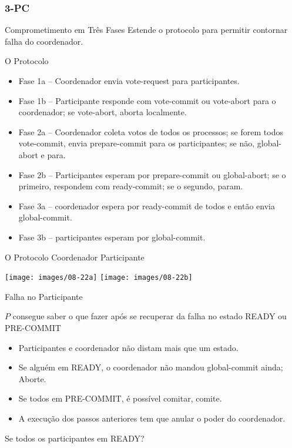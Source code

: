 \subsubsection{3-PC}

\begin{frame}{Comprometimento em Três Fases}
Estende o protocolo para permitir contornar  falha do coordenador.
\end{frame}


\begin{frame}{O Protocolo}
\begin{itemize}
	\item Fase 1a -- Coordenador envia vote-request para participantes.
	\item Fase 1b -- Participante responde com vote-commit ou vote-abort para o coordenador; se vote-abort, aborta localmente.
	\item Fase 2a -- Coordenador coleta votos de todos os processos; se forem todos vote-commit, envia \alert{prepare-commit} para os participantes; se não, global-abort e para.
	\item Fase 2b -- Participantes esperam por prepare-commit ou global-abort; se o primeiro, \alert{respondem com ready-commit}; se o segundo, param.
	\item Fase 3a -- coordenador espera por ready-commit de todos e então envia global-commit.
	\item Fase 3b -- participantes esperam por global-commit.
\end{itemize}
\end{frame}

\begin{frame}{O Protocolo}
Coordenador \hfill Participante

\texttt{[image: images/08-22a]}
\hfill
\texttt{[image: images/08-22b]}
\end{frame}


\begin{frame}{Falha no Participante}

$P$ consegue saber o que fazer após se recuperar da falha no estado READY ou PRE-COMMIT

\pause 
\begin{itemize}
	\item Participantes e coordenador não distam mais que um estado.
	\item Se alguém em READY, o coordenador não mandou global-commit ainda; Aborte.
	\item Se \alert{todos} em PRE-COMMIT, é possível comitar, comite.
	\item A execução dos passos anteriores tem que anular o poder do coordenador.
\end{itemize}
\pause \alert{Se todos os participantes em READY?}
\end{frame}

